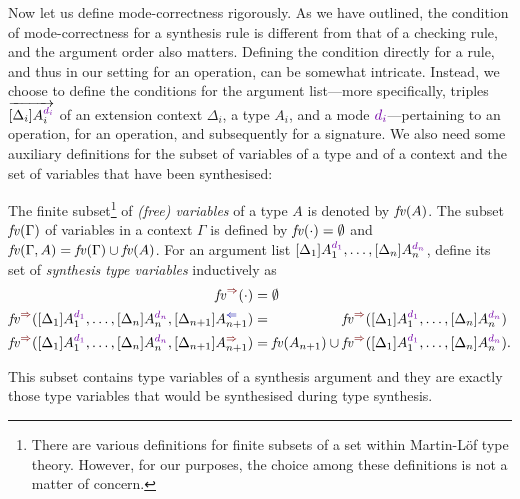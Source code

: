 Now let us define mode-correctness rigorously.
As we have outlined, the condition of mode-correctness for a synthesis rule is different from that of a checking rule, and the argument order also matters.
Defining the condition directly for a rule, and thus in our setting for an operation, can be somewhat intricate.
Instead, we choose to define the conditions for the argument list---more specifically, triples $\biargvec$ of an extension context $\Delta_i$, a type $A_i$, and a mode $\dir{d_i}$---pertaining to an operation, for an operation, and subsequently for a signature.
We also need some auxiliary definitions for the subset of variables of a type and of a context and the set of variables that have been synthesised:
\begin{definition}
  The finite subset\footnote{%
  There are various definitions for finite subsets of a set within Martin-L\"{o}f type theory.
  However, for our purposes, the choice among these definitions is not a matter of concern.}
  of \emph{(free) variables} of a type $A$ is denoted by $\mathit{fv}(A)$.
  The subset $\mathit{fv}(\Gamma)$ of variables in a context $\Gamma$ is defined by\/ $\mathit{fv}(\cdot) = \emptyset$ and\/ $\mathit{fv}(\Gamma, A) = \mathit{fv}(\Gamma) \cup \mathit{fv}(A)$.
  For an argument list $\biargs$, define its set of \emph{synthesis type variables} inductively as 
  \begin{align}
    \label{eq:synvar1}\synvar(\cdot)                   & = \emptyset  \\
    \label{eq:synvar2}\synvar(\biargs, \chkbiarg[n+1]) & = \phantom{\fv(A_{n+1}) \cup {}} \synvar(\biargs) \\
    \label{eq:synvar3}\synvar(\biargs, \synbiarg[n+1]) & = \fv(A_{n+1}) \cup           \synvar(\biargs).
  \end{align}
\end{definition}
This subset contains type variables of a synthesis argument and they are exactly those type variables that would be synthesised during type synthesis.

